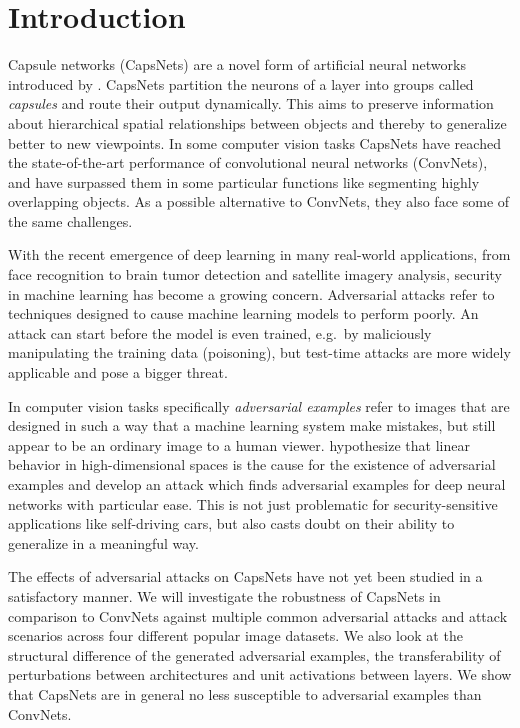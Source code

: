 \section{Introduction}
\label{sec:introduction}

Capsule networks (CapsNets) are a novel form of artificial neural networks introduced by \citet{capsules,em}.
CapsNets partition the neurons of a layer into groups called \emph{capsules} and route their output dynamically.
This aims to preserve information about hierarchical spatial relationships between objects and thereby to generalize better to new viewpoints.
In some computer vision tasks CapsNets have reached the state-of-the-art performance of convolutional neural networks (ConvNets), and have surpassed them in some particular functions like segmenting highly overlapping objects.
As a possible alternative to ConvNets, they also face some of the same challenges.

With the recent emergence of deep learning in many real-world applications, from face recognition to brain tumor detection and satellite imagery analysis, security in machine learning has become a growing concern.
Adversarial attacks refer to techniques designed to cause machine learning models to perform poorly.
An attack can start before the model is even trained, e.g.\ by maliciously manipulating the training data (poisoning), but test-time attacks are more widely applicable and pose a bigger threat.

In computer vision tasks specifically \emph{adversarial examples} \citep{intriguing} refer to images  that are designed in such a way that a machine learning system make mistakes, but still appear to be an ordinary image to a human viewer.
\citet{fgsm} hypothesize that linear behavior in high-dimensional spaces is the cause for the existence of adversarial examples and develop an attack which finds adversarial examples for deep neural networks with particular ease.
This is not just problematic for security-sensitive applications like self-driving cars, but also casts doubt on their ability to generalize in a meaningful way.

The effects of adversarial attacks on CapsNets have not yet been studied in a satisfactory manner.
We will investigate the robustness of CapsNets in comparison to ConvNets against multiple common adversarial attacks and attack scenarios across four different popular image datasets.
We also look at the structural difference of the generated adversarial examples, the transferability of perturbations between architectures and unit activations between layers.
We show that CapsNets are in general no less susceptible to adversarial examples than ConvNets.

